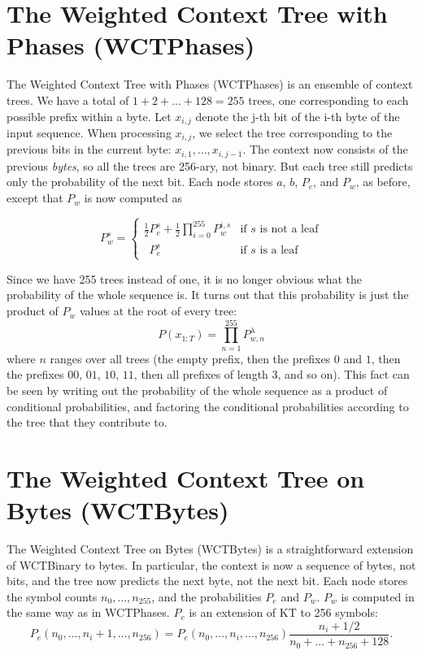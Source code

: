 \documentclass[11pt]{scrartcl}
\begin{document}
\section{The Weighted Context Tree with Phases (WCTPhases)}

The Weighted Context Tree with Phases (WCTPhases) is an ensemble of context
trees. We have a total of $1 + 2 + ... + 128 = 255$ trees, one corresponding to
each possible prefix within a byte. Let $x_{i,j}$ denote the j-th bit of the
i-th byte of the input sequence.  When processing $x_{i,j}$, we select the tree
corresponding to the previous bits in the current byte: $x_{i,1}, ...,
x_{i,j-1}$. The context now consists of the previous {\em bytes}, so all the
trees are 256-ary, not binary. But each tree still predicts only the
probability of the next bit. Each node stores $a$, $b$, $P_e$, and $P_w$, as
before, except that $P_w$ is now computed as

\[
P_w^s =
\left\{
\begin{array}{ll}
\frac{1}{2} P_e^s + \frac{1}{2} \prod_{i=0}^{255}{ P_w^{i,s} }
    & \mbox{if $s$ is not a leaf} \\
\phantom{\frac{1}{2}} P_e^s
    & \mbox{if $s$ is a leaf}
\end{array}
\right.
\]

Since we have 255 trees instead of one, it is no longer obvious what the
probability of the whole sequence is. It turns out that this probability is
just the product of $P_w$ values at the root of every tree:
\[
P(x_{1:T}) = \prod_{n=1}^{255} P_{w, n}^\lambda
\]
where $n$ ranges over all trees (the empty prefix, then the prefixes $0$ and
$1$, then the prefixes $00$, $01$, $10$, $11$, then all prefixes of length 3,
and so on). This fact can be seen by writing out the probability of the whole
sequence as a product of conditional probabilities, and factoring the
conditional probabilities according to the tree that they contribute to.


\section{The Weighted Context Tree on Bytes (WCTBytes)}

The Weighted Context Tree on Bytes (WCTBytes) is a straightforward extension of
WCTBinary to bytes. In particular, the context is now a sequence of bytes, not
bits, and the tree now predicts the next byte, not the next bit. Each node
stores the symbol counts $n_0, ..., n_{255}$, and the probabilities $P_e$ and
$P_w$. $P_w$ is computed in the same way as in WCTPhases. $P_e$ is an
extension of KT to 256 symbols:
\[
P_e(n_0, ..., n_i + 1, ..., n_{256}) =
P_e(n_0, ..., n_i, ..., n_{256})
\frac{ n_i + 1/2 }{ n_0 + ... + n_{256} + 128 }.
\]
\end{document}
